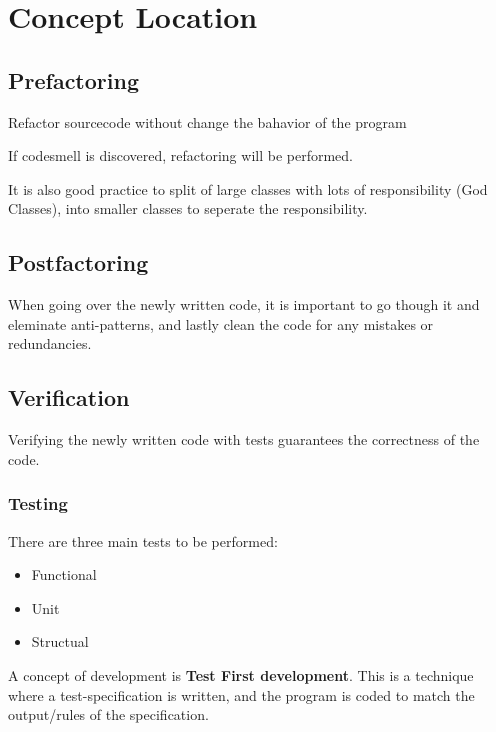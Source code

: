 \section{Concept Location}

\subsection{Prefactoring}
\begin{flushleft}
Refactor sourcecode without change the bahavior of the program
\end{flushleft}

\begin{flushleft}
If codesmell is discovered, refactoring will be performed.
\end{flushleft}

\begin{flushleft}
	It is also good practice to split of large classes with lots of responsibility (God Classes), into smaller classes to seperate the responsibility.
\end{flushleft}

\subsection{Postfactoring}
\begin{flushleft}
When going over the newly written code, it is important to go though it and eleminate anti-patterns, and lastly clean the code for any mistakes or redundancies.
\end{flushleft}

\subsection{Verification}
\begin{flushleft}
Verifying the newly written code with tests guarantees the correctness of the code.

\subsubsection{Testing}
There are three main tests to be performed:
\begin{itemize}
	\item Functional
	\item Unit
	\item Structual
\end{itemize}

A concept of development is \textbf{Test First development}. This is a technique where a test-specification is written, and the program is coded to match the output/rules of the specification.
\end{flushleft}

